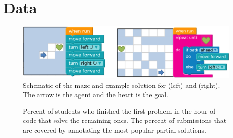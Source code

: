 \section{Data}

\begin{figure}
\centering
\includegraphics[width=1.0\columnwidth]{img/problems3.png}

\caption{Schematic of the maze and example solution for \Pa (left) and \Pb (right). The arrow is the agent and the heart is the goal.}
\label{fig:hocExample}
\end{figure}

\begin{figure}
\centering
{}

\caption{
 Percent of students who finished the first problem in the hour of code that solve the remaining ones.
  The percent of submissions that are covered by annotating the most popular partial solutions. 
 }
\label{tab:predacc}
\end{figure}


